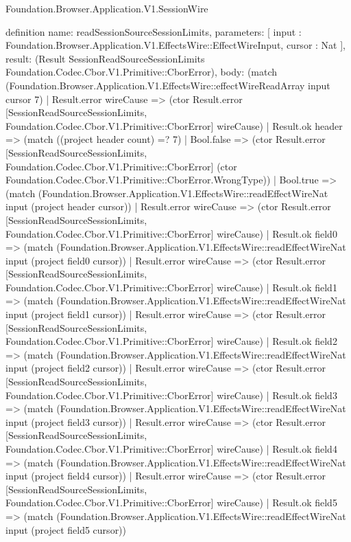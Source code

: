 \begin{lexlean}{Foundation.Browser.Application.V1.SessionWire}
\begin{semanticmodule}
definition{
  name: readSessionSourceSessionLimits,
  parameters: [
    input : Foundation.Browser.Application.V1.EffectsWire::EffectWireInput,
    cursor : Nat
  ],
  result: (Result SessionReadSourceSessionLimits Foundation.Codec.Cbor.V1.Primitive::CborError),
  body: (match (Foundation.Browser.Application.V1.EffectsWire::effectWireReadArray input cursor 7)
    | Result.error wireCause => (ctor Result.error [SessionReadSourceSessionLimits, Foundation.Codec.Cbor.V1.Primitive::CborError] wireCause)
    | Result.ok header => (match ((project header count) =? 7)
      | Bool.false => (ctor Result.error [SessionReadSourceSessionLimits, Foundation.Codec.Cbor.V1.Primitive::CborError] (ctor Foundation.Codec.Cbor.V1.Primitive::CborError.WrongType))
      | Bool.true => (match (Foundation.Browser.Application.V1.EffectsWire::readEffectWireNat input (project header cursor))
        | Result.error wireCause => (ctor Result.error [SessionReadSourceSessionLimits, Foundation.Codec.Cbor.V1.Primitive::CborError] wireCause)
        | Result.ok field0 => (match (Foundation.Browser.Application.V1.EffectsWire::readEffectWireNat input (project field0 cursor))
          | Result.error wireCause => (ctor Result.error [SessionReadSourceSessionLimits, Foundation.Codec.Cbor.V1.Primitive::CborError] wireCause)
          | Result.ok field1 => (match (Foundation.Browser.Application.V1.EffectsWire::readEffectWireNat input (project field1 cursor))
            | Result.error wireCause => (ctor Result.error [SessionReadSourceSessionLimits, Foundation.Codec.Cbor.V1.Primitive::CborError] wireCause)
            | Result.ok field2 => (match (Foundation.Browser.Application.V1.EffectsWire::readEffectWireNat input (project field2 cursor))
              | Result.error wireCause => (ctor Result.error [SessionReadSourceSessionLimits, Foundation.Codec.Cbor.V1.Primitive::CborError] wireCause)
              | Result.ok field3 => (match (Foundation.Browser.Application.V1.EffectsWire::readEffectWireNat input (project field3 cursor))
                | Result.error wireCause => (ctor Result.error [SessionReadSourceSessionLimits, Foundation.Codec.Cbor.V1.Primitive::CborError] wireCause)
                | Result.ok field4 => (match (Foundation.Browser.Application.V1.EffectsWire::readEffectWireNat input (project field4 cursor))
                  | Result.error wireCause => (ctor Result.error [SessionReadSourceSessionLimits, Foundation.Codec.Cbor.V1.Primitive::CborError] wireCause)
                  | Result.ok field5 => (match (Foundation.Browser.Application.V1.EffectsWire::readEffectWireNat input (project field5 cursor))
}
\end{semanticmodule}
\end{lexlean}

